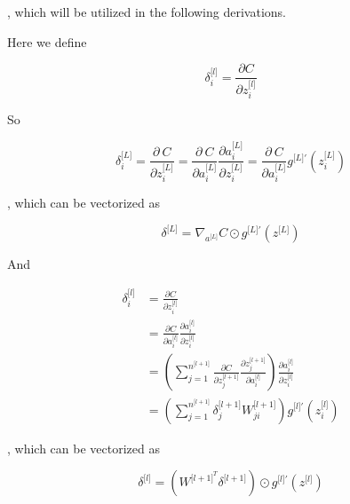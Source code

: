 \documentclass[11pt]{scrartcl} %
\begin{document}
, which will be utilized in the following derivations.

Here we define

\begin{equation}
\delta_i^{\lbrack l\rbrack}=\frac{\partial C}{\partial z_i^{\lbrack l\rbrack}}
\end{equation}

So 

\begin{equation}
\delta_i^{\lbrack L\rbrack}=\frac{\partial\ C}{\partial z_i^{\lbrack L\rbrack}}=\frac{\partial\ C}{\partial a_i^{\lbrack L\rbrack}}\frac{\partial a_i^{\lbrack L\rbrack}}{\partial z_i^{\lbrack L\rbrack}}=\frac{\partial\ C}{\partial a_i^{\lbrack L\rbrack}}g^{{\lbrack L\rbrack}'}(z_i^{\lbrack L\rbrack})
\end{equation}

, which can be vectorized as 

\begin{equation}
\delta^{\lbrack L\rbrack}=\nabla_{a^{\lbrack L\rbrack}}C\odot g^{{\lbrack L\rbrack}'}(z^{\lbrack L\rbrack})
\label{bp1}
\end{equation}

And 

\begin{equation}
\begin{split}
\delta_i^{\lbrack l\rbrack} &=\frac{\partial C}{\partial z_i^{\lbrack l\rbrack}} \\
&=\frac{\partial C}{\partial a_i^{\lbrack l\rbrack}}\frac{\partial a_i^{\lbrack l\rbrack}}{\partial z_i^{\lbrack l\rbrack}} \\
&=(\sum_{j=1}^{n^{\lbrack l+1\rbrack}}\frac{\partial C}{\partial z_j^{\lbrack l+1\rbrack}}\frac{\partial z_j^{\lbrack l+1\rbrack}}{\partial a_i^{\lbrack l\rbrack}})\frac{\partial a_i^{\lbrack l\rbrack}}{\partial z_i^{\lbrack l\rbrack}} \\
&=(\sum_{j=1}^{n^{\lbrack l+1\rbrack}}\delta_j^{\lbrack l+1\rbrack}W_{ji}^{\lbrack l+1\rbrack})g^{{\lbrack l\rbrack}'}(z_i^{\lbrack l\rbrack})
\end{split}
\end{equation}

, which can be vectorized as 

\begin{equation}
\delta^{\lbrack l\rbrack}=(W^{{\lbrack l+1\rbrack}^T}\delta^{\lbrack l+1\rbrack})\odot g^{{\lbrack l\rbrack}'}(z^{\lbrack l\rbrack})
\label{bp2}
\end{equation}
\end{document}
